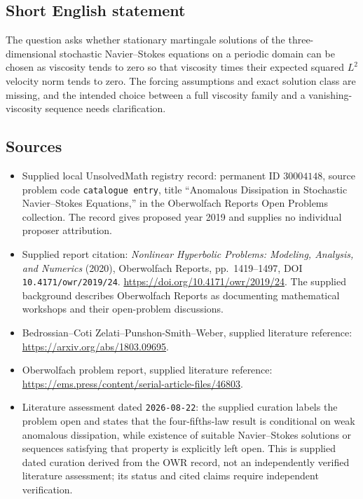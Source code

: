 \documentclass[11pt]{article}
\begin{document}
\subsection{Short English statement}
The question asks whether stationary martingale solutions of the three-dimensional stochastic Navier--Stokes equations on a periodic domain can be chosen as viscosity tends to zero so that viscosity times their expected squared \(L^2\) velocity norm tends to zero. The forcing assumptions and exact solution class are missing, and the intended choice between a full viscosity family and a vanishing-viscosity sequence needs clarification.
\subsection{Sources}
\begin{itemize}
\item Supplied local UnsolvedMath registry record: permanent ID \(30004148\), source problem code \texttt{catalogue entry}, title ``Anomalous Dissipation in Stochastic Navier--Stokes Equations,'' in the Oberwolfach Reports Open Problems collection. The record gives proposed year 2019 and supplies no individual proposer attribution.
\item Supplied report citation: \emph{Nonlinear Hyperbolic Problems: Modeling, Analysis, and Numerics} (2020), Oberwolfach Reports, pp.~1419--1497, DOI \texttt{10.4171/owr/2019/24}. \url{https://doi.org/10.4171/owr/2019/24}. The supplied background describes Oberwolfach Reports as documenting mathematical workshops and their open-problem discussions.
\item Bedrossian--Coti Zelati--Punshon-Smith--Weber, supplied literature reference: \url{https://arxiv.org/abs/1803.09695}.
\item Oberwolfach problem report, supplied literature reference: \url{https://ems.press/content/serial-article-files/46803}.
\item Literature assessment dated \texttt{2026-08-22}: the supplied curation labels the problem open and states that the four-fifths-law result is conditional on weak anomalous dissipation, while existence of suitable Navier--Stokes solutions or sequences satisfying that property is explicitly left open. This is supplied dated curation derived from the OWR record, not an independently verified literature assessment; its status and cited claims require independent verification.
\end{itemize}
\end{document}
